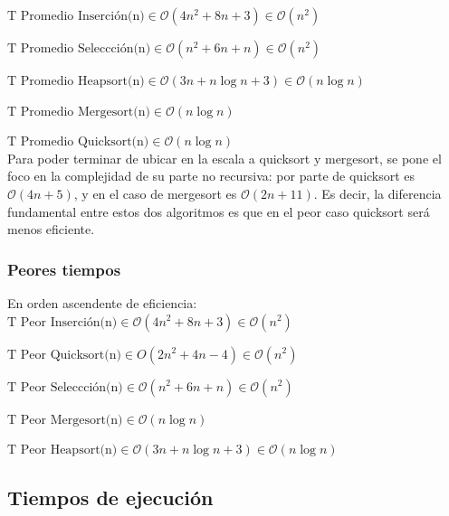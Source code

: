 \documentclass[article,a4paper]{article}
\newcommand{\bigO}{\mathcal{O}}
\begin{document}
$\mbox{T Promedio Inserción(n)} \in \bigO(4n^2 + 8n + 3) \in \bigO(n^2)$

$\mbox{T Promedio Seleccción(n)} \in \bigO(n^2 + 6n + n) \in \bigO(n^2)$

$\mbox{T Promedio Heapsort(n)} \in \bigO(3n + n \log n + 3) \in \bigO(n \log n)$

$\mbox{T Promedio Mergesort(n)} \in \bigO(n \log n)$

$\mbox{T Promedio Quicksort(n)} \in \bigO(n \log n)$\\

Para poder terminar de ubicar en la escala a quicksort y mergesort, se pone el foco en la complejidad de su parte no recursiva: por parte de quicksort es $\bigO(4n + 5)$, y en el caso de mergesort es $\bigO(2n + 11)$. Es decir, la diferencia fundamental entre estos dos algoritmos es que en el peor caso quicksort será menos eficiente.

\subsubsection{Peores tiempos}

En orden ascendente de eficiencia:\\

$\mbox{T Peor Inserción(n)} \in \bigO(4n^2 + 8n + 3) \in \bigO(n^2)$

$\mbox{T Peor Quicksort(n)} \in O(2 n ^2 + 4n - 4) \in \bigO(n^2)$

$\mbox{T Peor Seleccción(n)} \in \bigO(n^2 + 6n + n) \in \bigO(n^2)$

$\mbox{T Peor Mergesort(n)} \in \bigO(n \log n) $

$\mbox{T Peor Heapsort(n)} \in \bigO(3n + n \log n + 3) \in \bigO(n \log n)$

\subsection{Tiempos de ejecución}

\end{document}
